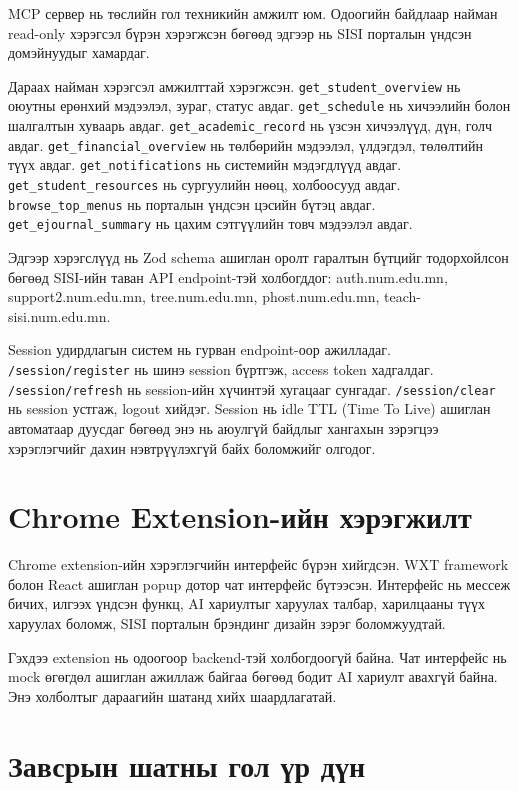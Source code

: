 MCP сервер нь төслийн гол техникийн амжилт юм. Одоогийн байдлаар найман read-only хэрэгсэл бүрэн хэрэгжсэн бөгөөд эдгээр нь SISI порталын үндсэн домэйнуудыг хамардаг.

Дараах найман хэрэгсэл амжилттай хэрэгжсэн. \texttt{get\_student\_overview} нь оюутны ерөнхий мэдээлэл, зураг, статус авдаг. \texttt{get\_schedule} нь хичээлийн болон шалгалтын хуваарь авдаг. \texttt{get\_academic\_record} нь үзсэн хичээлүүд, дүн, голч авдаг. \texttt{get\_financial\_overview} нь төлбөрийн мэдээлэл, үлдэгдэл, төлөлтийн түүх авдаг. \texttt{get\_notifications} нь системийн мэдэгдлүүд авдаг. \texttt{get\_student\_resources} нь сургуулийн нөөц, холбоосууд авдаг. \texttt{browse\_top\_menus} нь порталын үндсэн цэсийн бүтэц авдаг. \texttt{get\_ejournal\_summary} нь цахим сэтгүүлийн товч мэдээлэл авдаг.

Эдгээр хэрэгслүүд нь Zod schema ашиглан оролт гаралтын бүтцийг тодорхойлсон бөгөөд SISI-ийн таван API endpoint-тэй холбогддог: auth.num.edu.mn, support2.num.edu.mn, tree.num.edu.mn, phost.num.edu.mn, teach-sisi.num.edu.mn.

Session удирдлагын систем нь гурван endpoint-оор ажилладаг. \texttt{/session/register} нь шинэ session бүртгэж, access token хадгалдаг. \texttt{/session/refresh} нь session-ийн хүчинтэй хугацааг сунгадаг. \texttt{/session/clear} нь session устгаж, logout хийдэг. Session нь idle TTL (Time To Live) ашиглан автоматаар дуусдаг бөгөөд энэ нь аюулгүй байдлыг хангахын зэрэгцээ хэрэглэгчийг дахин нэвтрүүлэхгүй байх боломжийг олгодог.

\section{Chrome Extension-ийн хэрэгжилт}

Chrome extension-ийн хэрэглэгчийн интерфейс бүрэн хийгдсэн. WXT framework болон React ашиглан popup дотор чат интерфейс бүтээсэн. Интерфейс нь мессеж бичих, илгээх үндсэн функц, AI хариултыг харуулах талбар, харилцааны түүх харуулах боломж, SISI порталын брэндинг дизайн зэрэг боломжуудтай.

Гэхдээ extension нь одоогоор backend-тэй холбогдоогүй байна. Чат интерфейс нь mock өгөгдөл ашиглан ажиллаж байгаа бөгөөд бодит AI хариулт авахгүй байна. Энэ холболтыг дараагийн шатанд хийх шаардлагатай.

\section{Завсрын шатны гол үр дүн}

